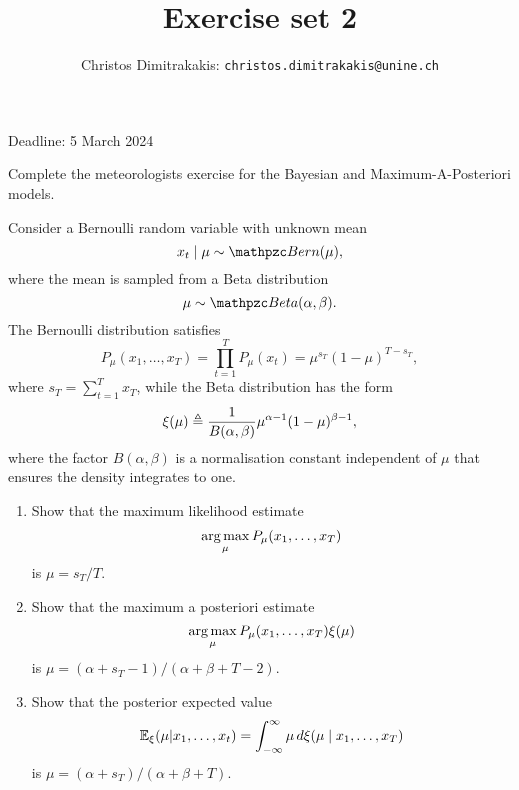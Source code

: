 \documentclass[twoside,a4paper]{article}
\begin{document}
\title{Exercise set 2}

\author{Christos Dimitrakakis: \texttt{christos.dimitrakakis@unine.ch}}

\maketitle
\large{Deadline: 5 March 2024}


\vspace{1em}


\begin{exercise}
  Complete the meteorologists exercise for the Bayesian and Maximum-A-Posteriori models.
\end{exercise}

\begin{exercise}
  Consider a  Bernoulli random variable with unknown mean
  \[
    x_t \mid \mu \sim \Bernoulli(\mu),
  \]
  where the mean is sampled from a Beta distribution
  \[
    \mu \sim \Beta(\alpha, \beta).
  \]
  The Bernoulli distribution satisfies
  \[
    P_\mu(x_1, \ldots, x_T) = \prod_{t=1}^T P_\mu(x_t) =  \mu^{s_T} (1 - \mu)^{T - s_T},
  \]
  where $s_T = \sum_{t=1}^T x_T$, while the Beta distribution has the form
  \[
    \xi(\mu) \mathrel{\triangleq} \frac{1}{B(\alpha, \beta)} \mu^{\alpha - 1} (1 - \mu)^{\beta - 1},
  \]
  where the factor $B(\alpha, \beta)$ is a normalisation constant independent of $\mu$ that ensures the density integrates to one.
  \begin{enumerate}
  \item Show that the maximum likelihood estimate
    \[
      \mathop{\rm arg\,max}_\mu P_\mu(x_1, \ldots, x_T) 
    \]
    is $\mu = s_T/T$.
  \item Show that the maximum a posteriori estimate
    \[
      \mathop{\rm arg\,max}_\mu P_\mu(x_1, \ldots, x_T) \xi(\mu)
    \]
    is $\mu = (\alpha + s_T - 1) / (\alpha + \beta + T - 2)$.
  \item Show that the posterior expected value
    \[
      \mathop{\mbox{\ensuremath{\mathbb{E}}}}\nolimits_\xi(\mu | x_1, \ldots, x_t) = \int_{-\infty}^\infty \mu \, d \xi(\mu \mid x_1, \ldots, x_T)
    \]
    is $\mu = (\alpha + s_T) / (\alpha + \beta + T)$.
  \end{enumerate}
  
\end{exercise}
\if{}
\end{document}
